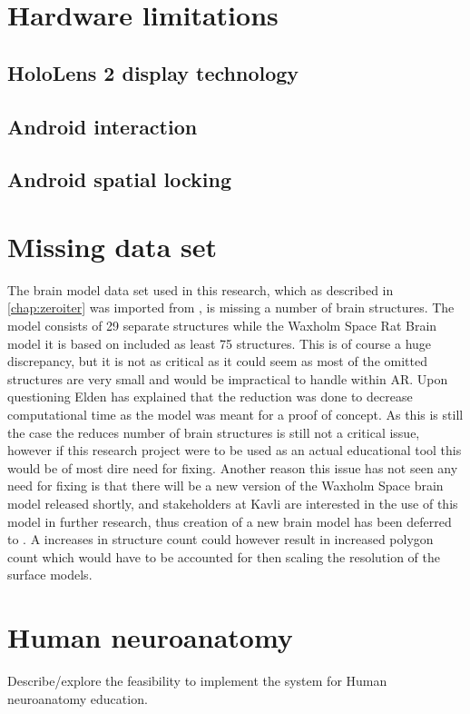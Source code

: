 \section{Hardware limitations}

\subsection*{HoloLens 2 display technology}

\subsection*{Android interaction}

\subsection*{Android spatial locking}

\section{Missing data set}
The brain model data set used in this research, which as described in \autoref{chap:zeroiter} was imported from , is missing a number of brain structures. The model consists of 29 separate structures while the Waxholm Space Rat Brain model it is based on included as least 75 structures. This is of course a huge discrepancy, but it is not as critical as it could seem as most of the omitted structures are very small and would be impractical to handle within AR. Upon questioning Elden has explained that the reduction was done to decrease computational time as the model was meant for a proof of concept. As this is still the case the reduces number of brain structures is still not a critical issue, however if this research project were to be used as an actual educational tool this would be of most dire need for fixing. Another reason this issue has not seen any need for fixing is that there will be a new version of the Waxholm Space brain model released shortly, and stakeholders at Kavli are interested in the use of this model in further research, thus creation of a new brain model has been deferred to . A increases in structure count could however result in increased polygon count which would have to be accounted for then scaling the resolution of the surface models.

\section{Human neuroanatomy}
Describe/explore the feasibility to implement the system for Human neuroanatomy education.

